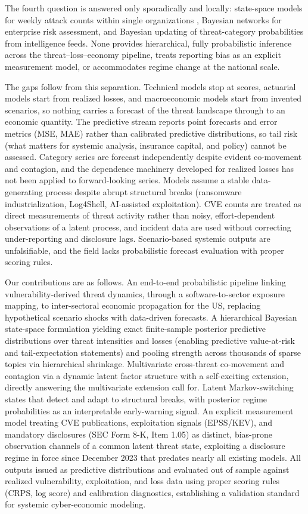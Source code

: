 \documentclass[review]{elsarticle}
\begin{document}
The fourth question is answered only sporadically and locally: state-space models for weekly attack counts within single organizations \citep{condon2008,okutan2018}, Bayesian networks for enterprise risk assessment, and Bayesian updating of threat-category probabilities from intelligence feeds. None provides hierarchical, fully probabilistic inference across the threat--loss--economy pipeline, treats reporting bias as an explicit measurement model, or accommodates regime change at the national scale.

The gaps follow from this separation. Technical models stop at scores, actuarial models start from realized losses, and macroeconomic models start from invented scenarios, so nothing carries a forecast of the threat landscape through to an economic quantity. The predictive stream reports point forecasts and error metrics (MSE, MAE) rather than calibrated predictive distributions, so tail risk (what matters for systemic analysis, insurance capital, and policy) cannot be assessed. Category series are forecast independently despite evident co-movement and contagion, and the dependence machinery developed for realized losses has not been applied to forward-looking series. Models assume a stable data-generating process despite abrupt structural breaks (ransomware industrialization, Log4Shell, AI-assisted exploitation). CVE counts are treated as direct measurements of threat activity rather than noisy, effort-dependent observations of a latent process, and incident data are used without correcting under-reporting and disclosure lags. Scenario-based systemic outputs are unfalsifiable, and the field lacks probabilistic forecast evaluation with proper scoring rules.

Our contributions are as follows. An end-to-end probabilistic pipeline linking vulnerability-derived threat dynamics, through a software-to-sector exposure mapping, to inter-sectoral economic propagation for the US, replacing hypothetical scenario shocks with data-driven forecasts. A hierarchical Bayesian state-space formulation yielding exact finite-sample posterior predictive distributions over threat intensities and losses (enabling predictive value-at-risk and tail-expectation statements) and pooling strength across thousands of sparse topics via hierarchical shrinkage. Multivariate cross-threat co-movement and contagion via a dynamic latent factor structure with a self-exciting extension, directly answering the multivariate extension \citet{kia2024} call for. Latent Markov-switching states that detect and adapt to structural breaks, with posterior regime probabilities as an interpretable early-warning signal. An explicit measurement model treating CVE publications, exploitation signals (EPSS/KEV), and mandatory disclosures (SEC Form 8-K, Item 1.05) as distinct, bias-prone observation channels of a common latent threat state, exploiting a disclosure regime in force since December 2023 that predates nearly all existing models. All outputs issued as predictive distributions and evaluated out of sample against realized vulnerability, exploitation, and loss data using proper scoring rules (CRPS, log score) and calibration diagnostics, establishing a validation standard for systemic cyber-economic modeling.
\end{document}
